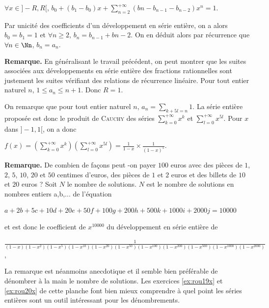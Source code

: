 {{\begin{center}
$\forall x\in]-R,R[$, $b_0 +(b_1-b_0)x+\sum_{n=2}^{+\infty}(bn-b_{n-1}-b_{n-2})x^n = 1$.
\end{center}

Par unicité des coefficients d'un développement en série entière, on a alors $b_0=b_1= 1$ et $\forall n\geqslant2$, $b_n = b_{n-1}+b{n-2}$. On en déduit alors par récurrence que $\forall n\in\Nn$, $b_n = a_n$.

\begin{center}
\fbox{
$\forall x\in\left]-\frac{\sqrt{5}-1}{2},\frac{\sqrt{5}-1}{2}\right[$, $\sum_{n=0}^{+\infty}a_nx^n=\frac{1}{1-x-x^2}$.
}
\end{center}

\textbf{Remarque.} En généralisant le travail précédent, on peut montrer que les suites associées aux développements en série entière des fractions rationnelles sont justement les suites vérifiant des relations de récurrence linéaire.
Pour tout entier naturel $n$, $1\leqslant a_n\leqslant n+1$. Donc $R = 1$.

On remarque que pour tout entier naturel $n$, $a_n =\sum_{k+5l=n}^{}1$. La série entière proposée est donc le produit de \textsc{Cauchy} des séries $\sum_{k=0}^{+\infty}x^k$ et $\sum_{l=0}^{+\infty}x^{5l}$. Pour $x$ dans $]-1,1[$, on a donc

\begin{center}
$f(x) =\left(\sum_{k=0}^{+\infty}x^k\right)\left(\sum_{l=0}^{+\infty}x^{5l}\right)=\frac{1}{1-x}\times\frac{1}{(1-x)^5}$.
\end{center}

\textbf{Remarque.} De combien de façons peut -on payer $100$ euros avec des pièces de $1$, $2$, $5$, $10$, $20$ et $50$ centimes d'euros, des pièces de $1$ et $2$ euros et des billets de $10$ et $20$ euros ? Soit $N$ le nombre de solutions. $N$ est le nombre de solutions en nombres entiers a,b,... de l'équation

\begin{center}
$a +2b +5c +10d +20e +50f +100g +200h+500k+1000i+2000j=10000$
\end{center}

et est donc le coefficient de $x^{10000}$ du développement en série entière de 

\begin{center}
$\frac{1}{(1-x)(1-x^2)(1-x^5)(1-x^{10})(1-x^{20})(1-x^{50})(1-x^{100})(1-x^{200})(1-x^{500})(1-x^{1000})(1-x^{2000})}$,
\end{center}

La remarque est néanmoins anecdotique et il semble bien préférable de dénombrer à la main le nombre de solutions. Les 
exercices \ref{ex:rou19x} et \ref{ex:rou20x} de cette planche font bien mieux comprendre à quel point les séries entières sont un outil intéressant pour les dénombrements.
}
}
